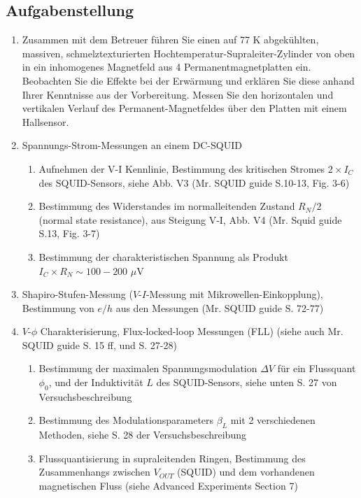 \documentclass{article}
\begin{document}
\subsection{Aufgabenstellung}
\begin{enumerate}
    \item Zusammen mit dem Betreuer führen Sie einen auf 77 K abgekühlten, massiven, schmelztexturierten Hochtemperatur-Supraleiter-Zylinder von oben in ein inhomogenes Magnetfeld aus 4 Permanentmagnetplatten ein. Beobachten Sie die Effekte bei der Erwärmung und erklären Sie diese anhand Ihrer Kenntnisse aus der Vorbereitung. Messen Sie den horizontalen und vertikalen Verlauf des Permanent-Magnetfeldes über den Platten mit einem Hallsensor.
    
    \item Spannungs-Strom-Messungen an einem DC-SQUID
    \begin{enumerate}
        \item Aufnehmen der V-I Kennlinie, Bestimmung des kritischen Stromes $2\times I_C$ des SQUID-Sensors, siehe Abb. V3 (Mr. SQUID guide S.10-13, Fig. 3-6)
        \item Bestimmung des Widerstandes im normalleitenden Zustand $R_N/2$ (normal state resistance), aus Steigung V-I, Abb. V4 (Mr. Squid guide S.13, Fig. 3-7) \cite{mr_squid}
        \item Bestimmung der charakteristischen Spannung als Produkt $I_C \times R_N \sim 100 - 200$ $\mu$V
    \end{enumerate}
    
    \item Shapiro-Stufen-Messung ($V$-$I$-Messung mit Mikrowellen-Einkopplung), Bestimmung von $e/h$ aus den Messungen (Mr. SQUID guide S. 72-77) \cite{mr_squid}
    
    \item $V$-$\phi$ Charakterisierung, Flux-locked-loop Messungen (FLL) (siehe auch Mr. SQUID guide S. 15 ff, und S. 27-28) \cite{mr_squid}
    \begin{enumerate}
        \item Bestimmung der maximalen Spannungsmodulation $\Delta V$ für ein Flussquant $\phi_0$, und der Induktivität $L$ des SQUID-Sensors, siehe unten S. 27 von Versuchsbeschreibung \cite{fprak_manual}
        \item Bestimmung des Modulationsparameters $\beta_L$ mit 2 verschiedenen Methoden, siehe S. 28 der Versuchsbeschreibung \cite{fprak_manual}
        \item Flussquantisierung in supraleitenden Ringen, Bestimmung des Zusammenhangs zwischen $V_{OUT}$ (SQUID) und dem vorhandenen magnetischen Fluss (siehe Advanced Experiments Section 7) \cite{mr_squid} 
    \end{enumerate}
    

\end{enumerate}
\end{document}
